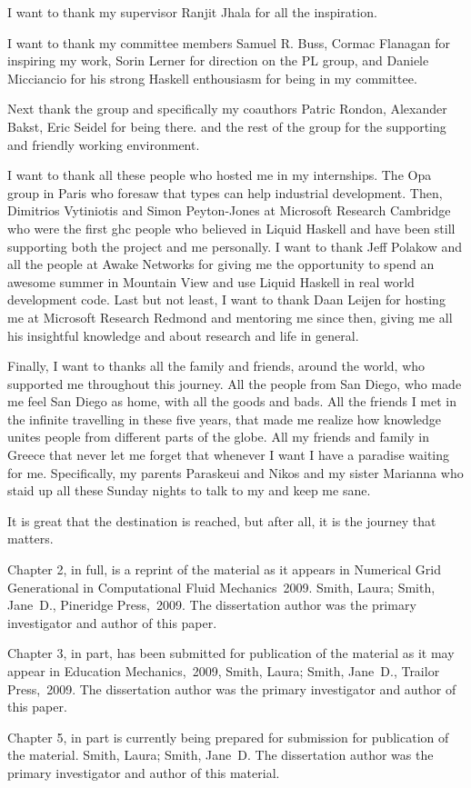 I want to thank my supervisor Ranjit Jhala for all the inspiration. 

I want to thank my committee members 
Samuel R. Buss, 
Cormac Flanagan for inspiring my work,
Sorin Lerner for direction on the PL group, 
and Daniele Micciancio for his strong Haskell enthousiasm 
for being in my committee. 

Next thank the group and specifically my coauthors
Patric Rondon,
Alexander Bakst, 
Eric Seidel for being there. 
and the rest of the group for the supporting and friendly working environment.

I want to thank all these people who hosted me in my internships. 
%
The Opa group in Paris who foresaw that types can help industrial development.
%
Then, Dimitrios Vytiniotis and Simon Peyton-Jones
at Microsoft Research Cambridge
who were the first ghc people who believed in Liquid Haskell
and have been still supporting both the project and me personally.
%
I want to thank Jeff Polakow and all the people at Awake Networks 
for giving me the opportunity to spend an awesome summer in Mountain View 
and use Liquid Haskell in real world development code. 
%
Last but not least, 
I want to thank Daan Leijen 
for hosting me at Microsoft Research Redmond 
and mentoring me since then, giving me all his insightful
knowledge and  about research and life in general.

Finally, I want to thanks all the family and friends, around the world,
who supported me throughout this journey.
%
All the people from San Diego, 
who made me feel San Diego as home, with all the goods and bads. 
%
All the friends I met in the infinite travelling in these five years, 
that made me realize how knowledge unites people from different parts of the globe.
%
All my friends and family in Greece that never let me forget that
whenever I want I have a paradise waiting for me.  
%
Specifically, my parents Paraskeui and Nikos and my sister Marianna
who staid up all these Sunday nights to talk to my and keep me sane. 


It is great that the destination is reached, 
but after all, it is the journey that matters. 




Chapter 2, in full, is a reprint of the material as it appears in
Numerical Grid Generational in Computational Fluid Mechanics~2009.
Smith, Laura; Smith, Jane~D., Pineridge Press,~2009. The dissertation
author was the primary investigator and author of this paper.

Chapter 3, in part, has been submitted for publication of the material
as it may appear in Education Mechanics,~2009, Smith, Laura; Smith,
Jane~D., Trailor Press,~2009. The dissertation author was the primary
investigator and author of this paper.

Chapter 5, in part is currently being prepared for submission for
publication of the material. Smith, Laura; Smith, Jane~D\@. The
dissertation author was the primary investigator and author of this
material.
